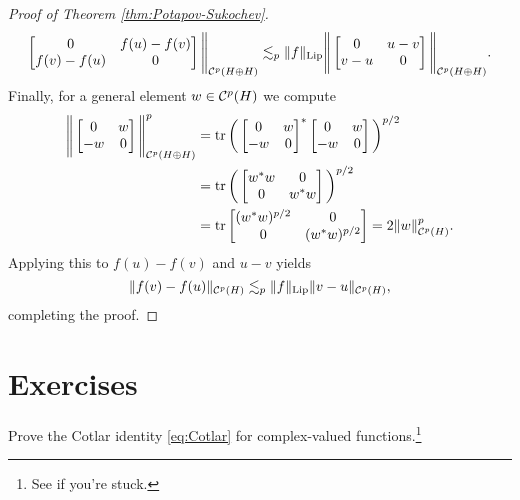 \begin{proof}[Proof of Theorem \ref{thm:Potapov-Sukochev}]
\begin{equation*}
\begin{bmatrix}
      0 & f(u) - f(v) \\ f(v) - f(u) & 0
    \end{bmatrix} \Bigg\|_{\mathcal{C}^{p}(H \oplus H)}
    \lesssim_{p} \|f\|_{\mathrm{Lip}}
    \Bigg\| \begin{bmatrix}
      0 & u - v \\ v - u & 0
    \end{bmatrix} \Bigg\|_{\mathcal{C}^{p}(H \oplus H)}.
  \end{equation*}
  Finally, for a general element $w \in \mathcal{C}^{p}(H)$ we compute
  \begin{equation*}
    \begin{aligned}
    \Bigg\| \begin{bmatrix}
      0 & w \\ -w & 0
    \end{bmatrix} \Bigg\|_{\mathcal{C}^{p}(H \oplus H)}^{p} 
    &= \operatorname{tr} \bigg( \begin{bmatrix}
      0 & w \\ -w & 0
    \end{bmatrix}^* \begin{bmatrix}
      0 & w \\ -w & 0
    \end{bmatrix} \bigg)^{p/2} \\
    &= \operatorname{tr}\bigg(
    \begin{bmatrix}
      w^{*}w  & 0 \\ 0 & w^{*} w
    \end{bmatrix}
    \bigg)^{p/2} \\
    &= \operatorname{tr}
    \begin{bmatrix}
      (w^* w)^{p/2}  & 0 \\ 0 & (w^* w)^{p/2}
    \end{bmatrix} 
    = 2\|w\|_{\mathcal{C}^{p}(H)}^{p}.
    \end{aligned}
  \end{equation*}
Applying this to $f(u) - f(v)$ and $u-v$ yields
\begin{equation*}
  \|f(v) - f(u)\|_{\mathcal{C}^{p}(H)} \lesssim_{p} \|f\|_{\mathrm{Lip}} \|v-u\|_{\mathcal{C}^{p}(H)},
\end{equation*}
completing the proof.
\end{proof}

\section{Exercises}

\begin{exercise}\label{ex:Cotlar}
  Prove the Cotlar identity \eqref{eq:Cotlar} for complex-valued functions.\footnote{See \cite[.a]{HNVW16} if you're stuck.}
\end{exercise}

